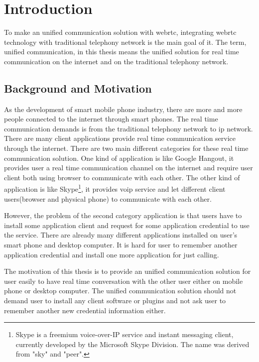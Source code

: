 \chapter{Introduction}
\label{chp:intro}

\noindent To make an unified communication solution with \gls{webrtc}, integrating \gls{webrtc} technology with traditional telephony network is the main goal of it. The term, unified communication, in this thesis means the unified solution for real time communication on the internet and on the traditional telephony network.

\section{Background and Motivation}

\par As the development of smart mobile phone industry, there are more and more people connected to the internet through smart phones. The real time communication demands is from the traditional telephony network to \gls{ip} network. There are many client applications provide real time communication service through the internet. There are two main different categories for these real time communication solution. One kind of application is like Google Hangout, it provides user a real time communication channel on the internet and require user client both using browser to communicate with each other. The other kind of application is like Skype\footnote{Skype is a freemium voice-over-IP service and instant messaging client, currently developed by the Microsoft Skype Division. The name was derived from "sky" and "peer".\cite{wiki:skype}}, it provides \gls{voip} service and let different client users(browser and physical phone) to communicate with each other.

\par However, the problem of the second category application is that users have to install some application client and request for some application credential to use the service. There are already many different applications installed on user's smart phone and desktop computer. It is hard for user to remember another application credential and install one more application for just calling.

\par The motivation of this thesis is to provide an unified communication solution for user easily to have real time conversation with the other user either on mobile phone or desktop computer. The unified communication solution should not demand user to install any client software or plugins and not ask user to remember another new credential information either.

